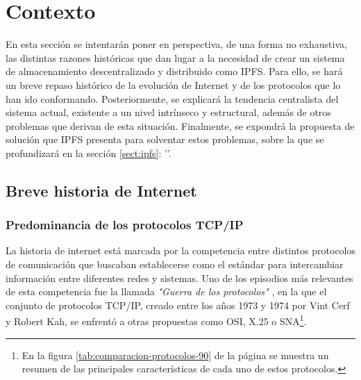 \chapter{Contexto}\label{chap:2contexto}

En esta sección se intentarán poner en perspectiva, de una forma no exhaustiva, las distintas razones
históricas que dan lugar a la necesidad de crear un sistema de almacenamiento descentralizado y distribuido como IPFS.
Para ello, se hará un breve repaso histórico de la evolución de Internet y de los protocolos que lo han ido conformando.
Posteriormente, se explicará la tendencia centralista del sistema actual, existente a un nivel intrínseco y estructural,
además de otros problemas que derivan de esta situación.
Finalmente, se expondrá la propuesta de solución que IPFS presenta para solventar estos problemas, sobre la que se profundizará en la sección \ref{sect:ipfs}: ''.

\section{Breve historia de Internet}
\subsection{Predominancia de los protocolos TCP/IP}
La historia de internet está marcada por la competencia entre distintos protocolos de comunicación que buscaban establecerse
como el estándar para intercambiar información entre diferentes redes y sistemas. Uno de los episodios más relevantes de esta
competencia fue la llamada \textit{"Guerra de los protocolos"} \cite{ProtocolWars2023}, en la que el conjunto de protocolos TCP/IP, creado entre los
años 1973 y 1974 por Vint Cerf y Robert Kah, se enfrentó a otras propuestas como OSI, X.25 o SNA\footnote{En la figura \ref{tab:comparacion-protocolos-90} de la página \pageref{tab:comparacion-protocolos-90} se muestra un resumen de las principales características de cada uno de estos protocolos.
}.

